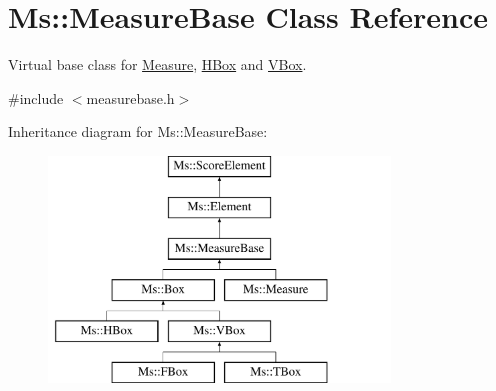 \hypertarget{class_ms_1_1_measure_base}{}\section{Ms\+:\+:Measure\+Base Class Reference}
\label{class_ms_1_1_measure_base}


Virtual base class for \hyperlink{class_ms_1_1_measure}{Measure}, \hyperlink{class_ms_1_1_h_box}{H\+Box} and \hyperlink{class_ms_1_1_v_box}{V\+Box}.  




{\ttfamily \#include $<$measurebase.\+h$>$}

Inheritance diagram for Ms\+:\+:Measure\+Base\+:\begin{figure}[H]
\begin{center}
\leavevmode
\includegraphics[height=6.000000cm]{class_ms_1_1_measure_base}
\end{center}
\end{figure}
